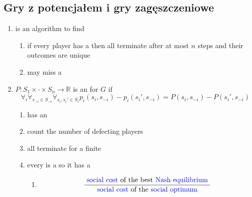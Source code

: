 \documentclass{article}
\newcommand\wassterm[1]{{\color{blue}{#1}}}
\begin{document}
\subsection{Gry z potencjałem i gry zagęszczeniowe}

\begin{enumerate}

  \item
    \wassterm{best response dynamics}
    is an algorithm to find
    \wassterm{Nash equilibrium}

    \begin{enumerate}
      \item
        if every player has a 
        \wassterm{strictly dominant strategy}
        then all
        \wassterm{best response dynamics}
        terminate after at most $n$ steps and their outcomes are unique
      \item
        \wassterm{best response dynamics}
        may miss a
        \wassterm{Nash equilibrium}
    \end{enumerate}
  \item
    $P: S_1\times \cdot \times S_n \rightarrow \mathbb{R}$ is an
    \wassterm{exact potential function}
    for $G$ if
    $$
    \forall_i \forall_{s_{-i} \in S_{-i}} \forall_{s_i, s_i' \in S_i}
    p_i(s_i, s_{-i}) -
    p_i(s_i', s_{-i}) = 
    P(s_i, s_{-i}) -
    P(s_i', s_{-i})
    $$
    \begin{enumerate}
      \item
        \wassterm{potential game}
        has an
        \wassterm{exact potential function}
      \item
        \wassterm{exact potential function}
        count the number of defecting players

      \item
        all
        \wassterm{best response dynamics}
        terminate for a finite
        \wassterm{potential game}

      \item
        every
        \wassterm{congestion game}
        is a
        \wassterm{potential game}
        so it has a
        \wassterm{Nash equilibrium}

        \begin{enumerate}
          \item
            \wassterm{price of stability}
            $$
            \frac{\text{
              \wassterm{social cost}
            of the best
            \wassterm{Nash equilibrium}
            }}{{\text{
              \wassterm{social cost}
            of the
            \wassterm{social optimum} 
            }}}
            $$
        \end{enumerate}
    \end{enumerate}

\end{enumerate}
\end{document}
